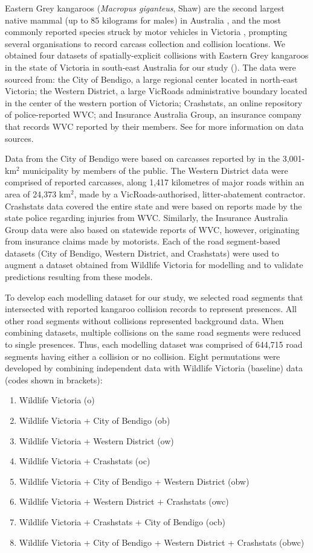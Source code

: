 Eastern Grey kangaroos (\textit{Macropus giganteus}, Shaw) are the second largest native mammal (up to 85 kilograms for males) in Australia \citep{coul10}, and the most commonly reported species struck by motor vehicles in Victoria \citep{rowd08}, prompting several organisations to record carcass collection and collision locations. We obtained four datasets of spatially-explicit collisions with Eastern Grey kangaroos in the state of Victoria in south-east Australia for our study (). The data were sourced from: the City of Bendigo, a large regional center located in north-east Victoria; the Western District, a large VicRoads administrative boundary located in the center of the western portion of Victoria; Crashstats, an online repository of police-reported WVC; and Insurance Australia Group, an insurance company that records WVC reported by their members. See  for more information on data sources.

Data from the City of Bendigo were based on carcasses reported by in the 3,001-km$^2$ municipality by members of the public. The Western District data were comprised of reported carcasses, along 1,417 kilometres of major roads within an area of 24,373 km$^2$, made by a VicRoads-authorised, litter-abatement contractor. Crashstats data covered the entire state and were based on reports made by the state police regarding injuries from WVC. Similarly, the Insurance Australia Group data were also based on statewide reports of WVC, however, originating from insurance claims made by motorists. Each of the road segment-based datasets (City of Bendigo, Western District, and Crashstats) were used to augment a dataset obtained from Wildlife Victoria for modelling and to validate predictions resulting from these models.

To develop each modelling dataset for our study, we selected road segments that intersected with reported kangaroo collision records to represent presences. All other road segments without collisions represented background data. When combining datasets, multiple collisions on the same road segments were reduced to single presences. Thus, each modelling dataset was comprised of 644,715 road segments having either a collision or no collision. Eight permutations were developed by combining independent data with Wildlife Victoria (baseline) data (codes shown in brackets):

\begin{enumerate}
	\item Wildlife Victoria (o)
	\item Wildlife Victoria + City of Bendigo (ob)
	\item Wildlife Victoria + Western District (ow)
	\item Wildlife Victoria + Crashstats (oc)
	\item Wildlife Victoria + City of Bendigo + Western District (obw)
	\item Wildlife Victoria + Western District + Crashstats (owc)
	\item Wildlife Victoria + Crashstats + City of Bendigo (ocb)
	\item Wildlife Victoria + City of Bendigo + Western District + Crashstats (obwc)
\end{enumerate}

